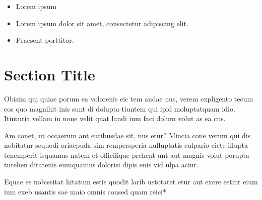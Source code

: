 \documentclass[
	landscape,       %
]{ImperialPoster}
\begin{document}
\begin{multicols}{4}
	\begin{itemize}
		\item Lorem ipsum
		\item Lorem ipsum dolor sit amet, consectetur adipiscing elit.
		\item Praesent porttitor.
	\end{itemize}

	\columnbreak{} %
	\section{Section Title}

	\begingroup
		\small %
		Obisim qui quiae porum ea volorenis eic tem andae nus, verem expligento tecum eos quo magnihit inis sunt di dolupta tiuntem qui ipid moluptatquam idio. Itinturia vellam in none velit quat landi ium faci dolum volut as ea cus.

		Am conet, ut occaerum ant eatibusdae sit, nus etur? Mincia cone verum qui dis nobitatur sequodi oriaepuda sim rempersperia nulluptatis culpario eicte illupta tenemperit isquamus natem et officilique prehent unt aut magnis volut porupta turehen ditatenis eumquamus dolorisi dipis enis vid ulpa aciur.\par
	\endgroup


	Equae es nobissitat hitatum estis quodit larib ustotatet etur aut exere estint eium ium exeb usantis sae maio omnis consed quam reici*



\end{multicols}
\end{document}
